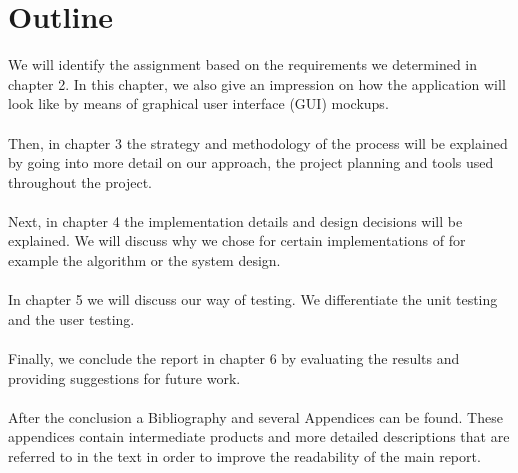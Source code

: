 \section{Outline}
We will identify the assignment based on the requirements we determined in chapter 2. 
In this chapter, we also give an impression on how the application will look like by means of graphical user interface (GUI) mockups.
\\\\
Then, in chapter 3 the strategy and methodology of the process will be explained by going into more detail on our approach, the project planning and tools used throughout the project.
\\\\
Next, in chapter 4 the implementation details and design decisions will be explained.
We will discuss why we chose for certain implementations of for example the algorithm or the system design.
\\\\
In chapter 5 we will discuss our way of testing. 
We differentiate the unit testing and the user testing.
\\\\
Finally, we conclude the report in chapter 6 by evaluating the results and providing suggestions for future work.
\\\\
After the conclusion a Bibliography and several Appendices can be found. 
These appendices contain intermediate products and more detailed descriptions that are referred to in the text in order to improve the readability of the main report.
